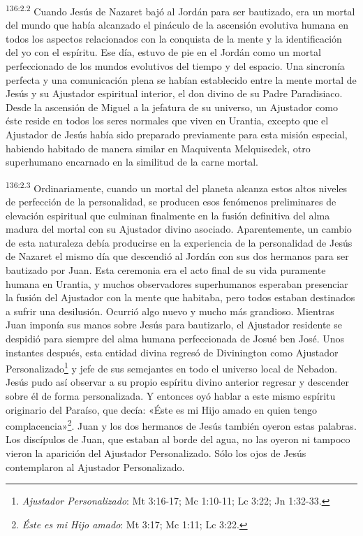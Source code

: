 \par
\textsuperscript{136:2.2} Cuando Jesús de Nazaret bajó al Jordán para ser bautizado, era un mortal del mundo que había alcanzado el pináculo de la ascensión evolutiva humana en todos los aspectos relacionados con la conquista de la mente y la identificación del yo con el espíritu. Ese día, estuvo de pie en el Jordán como un mortal perfeccionado de los mundos evolutivos del tiempo y del espacio. Una sincronía perfecta y una comunicación plena se habían establecido entre la mente mortal de Jesús y su Ajustador espiritual interior, el don divino de su Padre Paradisiaco. Desde la ascensión de Miguel a la jefatura de su universo, un Ajustador como éste reside en todos los seres normales que viven en Urantia, excepto que el Ajustador de Jesús había sido preparado previamente para esta misión especial, habiendo habitado de manera similar en Maquiventa Melquisedek, otro superhumano encarnado en la similitud de la carne mortal.

\par
\textsuperscript{136:2.3} Ordinariamente, cuando un mortal del planeta alcanza estos altos niveles de perfección de la personalidad, se producen esos fenómenos preliminares de elevación espiritual que culminan finalmente en la fusión definitiva del alma madura del mortal con su Ajustador divino asociado. Aparentemente, un cambio de esta naturaleza debía producirse en la experiencia de la personalidad de Jesús de Nazaret el mismo día que descendió al Jordán con sus dos hermanos para ser bautizado por Juan. Esta ceremonia era el acto final de su vida puramente humana en Urantia, y muchos observadores superhumanos esperaban presenciar la fusión del Ajustador con la mente que habitaba, pero todos estaban destinados a sufrir una desilusión. Ocurrió algo nuevo y mucho más grandioso. Mientras Juan imponía sus manos sobre Jesús para bautizarlo, el Ajustador residente se despidió para siempre del alma humana perfeccionada de Josué ben José. Unos instantes después, esta entidad divina regresó de Divinington como Ajustador Personalizado\footnote{\textit{Ajustador Personalizado}: Mt 3:16-17; Mc 1:10-11; Lc 3:22; Jn 1:32-33.} y jefe de sus semejantes en todo el universo local de Nebadon. Jesús pudo así observar a su propio espíritu divino anterior regresar y descender sobre él de forma personalizada. Y entonces oyó hablar a este mismo espíritu originario del Paraíso, que decía: «Éste es mi Hijo amado en quien tengo complacencia»\footnote{\textit{Éste es mi Hijo amado}: Mt 3:17; Mc 1:11; Lc 3:22.}. Juan y los dos hermanos de Jesús también oyeron estas palabras. Los discípulos de Juan, que estaban al borde del agua, no las oyeron ni tampoco vieron la aparición del Ajustador Personalizado. Sólo los ojos de Jesús contemplaron al Ajustador Personalizado.

